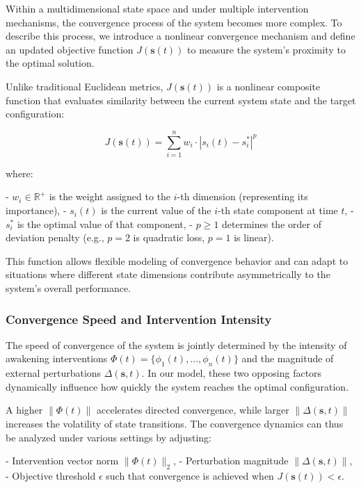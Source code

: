 \documentclass[12pt]{article}
\begin{document}
Within a multidimensional state space and under multiple intervention mechanisms, the convergence process of the system becomes more complex. To describe this process, we introduce a nonlinear convergence mechanism and define an updated objective function \( J(\mathbf{s}(t)) \) to measure the system's proximity to the optimal solution.

Unlike traditional Euclidean metrics, \( J(\mathbf{s}(t)) \) is a nonlinear composite function that evaluates similarity between the current system state and the target configuration:

\[
J(\mathbf{s}(t)) = \sum_{i=1}^{n} w_i \cdot \left| s_i(t) - s_i^* \right|^p
\]

where:

- \( w_i \in \mathbb{R}^+ \) is the weight assigned to the \( i \)-th dimension (representing its importance),
- \( s_i(t) \) is the current value of the \( i \)-th state component at time \( t \),
- \( s_i^* \) is the optimal value of that component,
- \( p \geq 1 \) determines the order of deviation penalty (e.g., \( p = 2 \) is quadratic loss, \( p = 1 \) is linear).

This function allows flexible modeling of convergence behavior and can adapt to situations where different state dimensions contribute asymmetrically to the system’s overall performance.

\subsubsection{Convergence Speed and Intervention Intensity}

The speed of convergence of the system is jointly determined by the intensity of awakening interventions \( \Phi(t) = \{\phi_1(t), \dots, \phi_n(t)\} \) and the magnitude of external perturbations \( \Delta(\mathbf{s}, t) \). In our model, these two opposing factors dynamically influence how quickly the system reaches the optimal configuration.

A higher \( \|\Phi(t)\| \) accelerates directed convergence, while larger \( \|\Delta(\mathbf{s}, t)\| \) increases the volatility of state transitions. The convergence dynamics can thus be analyzed under various settings by adjusting:

- Intervention vector norm \( \|\Phi(t)\|_2 \),
- Perturbation magnitude \( \|\Delta(\mathbf{s}, t)\| \),
- Objective threshold \( \epsilon \) such that convergence is achieved when \( J(\mathbf{s}(t)) < \epsilon \).
\end{document}

